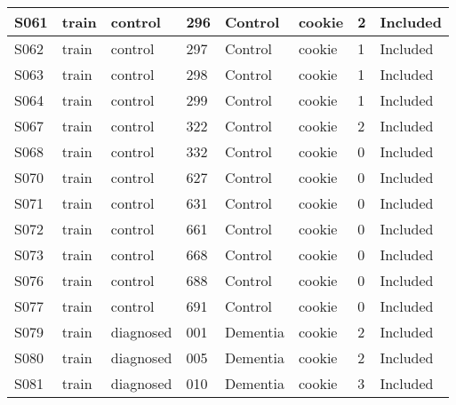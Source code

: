 \begin{center}
\begin{longtable}{|l|l|l|l|l|l|l|l|}
S061           & train                 & control           & 296     & Control        & cookie          & 2            & Included      \\ \hline
S062           & train                 & control           & 297     & Control        & cookie          & 1            & Included      \\ \hline
S063           & train                 & control           & 298     & Control        & cookie          & 1            & Included      \\ \hline
S064           & train                 & control           & 299     & Control        & cookie          & 1            & Included      \\ \hline
S067           & train                 & control           & 322     & Control        & cookie          & 2            & Included      \\ \hline
S068           & train                 & control           & 332     & Control        & cookie          & 0            & Included      \\ \hline
S070           & train                 & control           & 627     & Control        & cookie          & 0            & Included      \\ \hline
S071           & train                 & control           & 631     & Control        & cookie          & 0            & Included      \\ \hline
S072           & train                 & control           & 661     & Control        & cookie          & 0            & Included      \\ \hline
S073           & train                 & control           & 668     & Control        & cookie          & 0            & Included      \\ \hline
S076           & train                 & control           & 688     & Control        & cookie          & 0            & Included      \\ \hline
S077           & train                 & control           & 691     & Control        & cookie          & 0            & Included      \\ \hline
S079           & train                 & diagnosed         & 001     & Dementia       & cookie          & 2            & Included      \\ \hline
S080           & train                 & diagnosed         & 005     & Dementia       & cookie          & 2            & Included      \\ \hline
S081           & train                 & diagnosed         & 010     & Dementia       & cookie          & 3            & Included      \\ \hline

\end{longtable}
\end{center}
